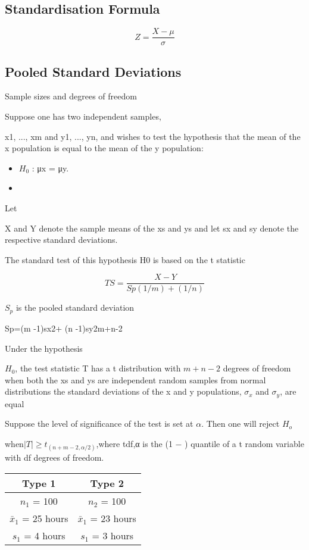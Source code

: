 \documentclass[]{report}
\begin{document}
{\subsection{Standardisation Formula}

\begin{equation}
Z = \frac{ X - \mu } {  \sigma }
\end{equation}
\subsection{Pooled Standard Deviations}

Sample sizes and degrees of freedom


Suppose one has two independent samples,

x1, ..., xm and y1, ..., yn, and wishes
to test the hypothesis that the mean of the
x population is equal to the mean
of the y population:

\begin{itemize}
\item $H_0$ : μx = μy.
\item 
\end{itemize}

Let

X and Y denote the sample means of the xs and ys and let sx and sy
denote the respective standard deviations.

The standard test of this hypothesis
H0 is based on the t statistic

\[TS =\frac{X-Y}{Sp(1/m )+ (1/n)}\]


$S_p$ is the pooled standard deviation


Sp=(m -1)sx2+ (n -1)sy2m+n-2

Under the hypothesis

$H_0$, the test statistic T has a t distribution with $m+n−2$
degrees of freedom when both the xs and ys are independent random samples from normal distributions the standard deviations of the x and y populations, $\sigma_x$ and $\sigma_y$, are equal

Suppose the level of significance of the test is set at $\alpha$. Then one will reject $H_o$

when$|T| ≥ t_{(n+m−2,\alpha/2)}$,where tdf,α is the (1 − ) quantile of a t random variable with df degrees of
freedom.




\begin{center}
\begin{tabular}{|c||c|}
\hline 
Type 1 & Type 2 \\ \hline \hline
$n_1$ = 100 & $n_2$ = 100 \\ \hline
$\bar{x}_1$ = 25 hours & $\bar{x}_1$ = 23 hours \\ \hline
$s_1$ = 4 hours & $s_1$ = 3 hours \\ \hline
\end{tabular} 
\end{center}

}
\end{document}
